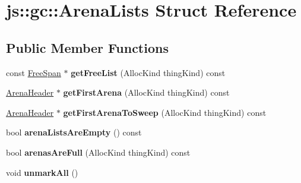 \hypertarget{structjs_1_1gc_1_1_arena_lists}{\section{js\-:\-:gc\-:\-:Arena\-Lists Struct Reference}
\label{structjs_1_1gc_1_1_arena_lists}
}
\subsection*{Public Member Functions}
\begin{DoxyCompactItemize}
\item 
\hypertarget{structjs_1_1gc_1_1_arena_lists_af31ff3949a871a0a7fcc1d6235a1476f}{const \hyperlink{structjs_1_1gc_1_1_free_span}{Free\-Span} $\ast$ {\bfseries get\-Free\-List} (Alloc\-Kind thing\-Kind) const }\label{structjs_1_1gc_1_1_arena_lists_af31ff3949a871a0a7fcc1d6235a1476f}

\item 
\hypertarget{structjs_1_1gc_1_1_arena_lists_ad5c24353cc884b96455865fe7865b2ba}{\hyperlink{structjs_1_1gc_1_1_arena_header}{Arena\-Header} $\ast$ {\bfseries get\-First\-Arena} (Alloc\-Kind thing\-Kind) const }\label{structjs_1_1gc_1_1_arena_lists_ad5c24353cc884b96455865fe7865b2ba}

\item 
\hypertarget{structjs_1_1gc_1_1_arena_lists_a903efcae5dd683a40b7f0e223d129e72}{\hyperlink{structjs_1_1gc_1_1_arena_header}{Arena\-Header} $\ast$ {\bfseries get\-First\-Arena\-To\-Sweep} (Alloc\-Kind thing\-Kind) const }\label{structjs_1_1gc_1_1_arena_lists_a903efcae5dd683a40b7f0e223d129e72}

\item 
\hypertarget{structjs_1_1gc_1_1_arena_lists_af0e33cf7f43ad28f98f8894be6424617}{bool {\bfseries arena\-Lists\-Are\-Empty} () const }\label{structjs_1_1gc_1_1_arena_lists_af0e33cf7f43ad28f98f8894be6424617}

\item 
\hypertarget{structjs_1_1gc_1_1_arena_lists_a2c6b18253dbecdba1d815104f09ef392}{bool {\bfseries arenas\-Are\-Full} (Alloc\-Kind thing\-Kind) const }\label{structjs_1_1gc_1_1_arena_lists_a2c6b18253dbecdba1d815104f09ef392}

\item 
\hypertarget{structjs_1_1gc_1_1_arena_lists_af4feafe8906fd67277b428b51919550e}{void {\bfseries unmark\-All} ()}\label{structjs_1_1gc_1_1_arena_lists_af4feafe8906fd67277b428b51919550e}


\end{DoxyCompactItemize}
